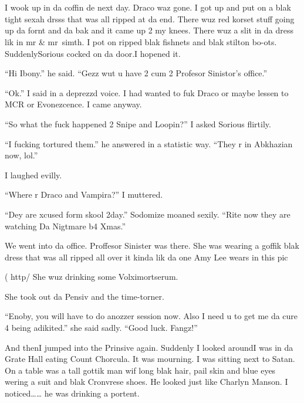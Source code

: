 \section{}



I wook up in da coffin de next day. Draco waz gone. I got up and put on a blak tight sexah drsss that was all ripped at da end. There wuz red korset stuff going up da fornt and da bak and it came up 2 my knees. There wuz a slit in da dress lik in mr \& mr~simth. I pot on ripped blak fishnets and blak stilton bo-ots. Suddenly\dotfill Sorious cocked on da door.\newline I hopened it.

\enquote{Hi Ibony.} he said. \enquote{Gezz wut u have 2 cum 2 Profesor Sinistor's office.}

\enquote{Ok.} I said in a deprezzd voice. I had wanted to fuk Draco or maybe lessen to MCR or Evonezcence. I came anyway.

\enquote{So what the fuck happened 2 Snipe and Loopin?} I asked Sorious flirtily.

\enquote{I fucking tortured them.} he answered in a statistic way. \enquote{They r in Abkhazian now, lol.}

I laughed evilly.

\enquote{Where r Draco and Vampira?} I muttered.

\enquote{Dey are xcused form skool 2day.} Sodomize moaned sexily. \enquote{Rite now they are watching Da Nigtmare b4 Xmas.}

We went into da office. Proffesor Sinister was there. She was wearing a goffik blak dress that was all ripped all over it kinda lik da one Amy Lee wears in this pic

( http/ She wuz drinking some Volximortserum.

She took out da Pensiv and the time-torner.

\enquote{Enoby, you will have to do anozzer session now. Also I need u to get me da cure 4 being adikited.} she said sadly. \enquote{Good luck. Fangz!}

And then\dotfill I jumped into the Prinsive again.\newline
Suddenly I looked around\dotfill I was in da Grate Hall\newline
eating Count Chorcula. It was mourning. I was sitting next to Satan. On a table was a tall gottik man wif long blak hair, pail skin and blue eyes wering a suit and blak Cronvrese shoes. He looked just like Charlyn Manson. I noticed\ldots{}\ldots{} he was drinking a portent.

